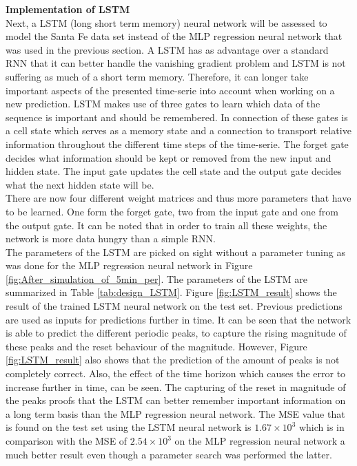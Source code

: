 \documentclass[a4paper,10pt]{article}
\begin{document}
\textbf{Implementation of LSTM}\\
Next, a LSTM (long short term memory) neural network will be assessed to model the Santa Fe data set instead of the MLP regression neural network that was used in the previous section. A LSTM has as advantage over a standard RNN that it can better handle the vanishing gradient problem and LSTM is not suffering as much of a short term memory. Therefore, it can longer take important aspects of the presented time-serie into account when working on a new prediction. LSTM makes use of three gates to learn which data of the sequence is important and should be remembered. In connection of these gates is a cell state which serves as a memory state and a connection to transport relative information throughout the different time steps of the time-serie. The forget gate decides what information should be kept or removed from the new input and hidden state. The input gate updates the cell state and the output gate decides what the next hidden state will be.\\
There are now four different weight matrices and thus more parameters that have to be learned. One form the forget gate, two from the input gate and one from the output gate. It can be noted that in order to train all these weights, the network is more data hungry than a simple RNN.\\

The parameters of the LSTM are picked on sight without a parameter tuning as was done for the MLP regression neural network in Figure \ref{fig:After_simulation_of_5min_per}. The parameters of the LSTM are summarized in Table \ref{tab:design_LSTM}. Figure \ref{fig:LSTM_result} shows the result of the trained LSTM neural network on the test set. Previous predictions are used as inputs for predictions further in time. It can be seen that the network is able to predict the different periodic peaks, to capture the rising magnitude of these peaks and the reset behaviour of the magnitude. However, Figure \ref{fig:LSTM_result} also shows that the prediction of the amount of peaks is not completely correct. Also, the effect of the time horizon which causes the error to increase further in time, can be seen. The capturing of the reset in magnitude of the peaks proofs that the LSTM can better remember important information on a long term basis  than the MLP regression neural network. The MSE value that is found on the test set using the LSTM neural network is  $ 1.67\times10^{3} $ which is in comparison with the MSE of  $ 2.54\times10^{3} $ on the MLP regression neural network a much better result even though a parameter search was performed the latter. 
\end{document}
